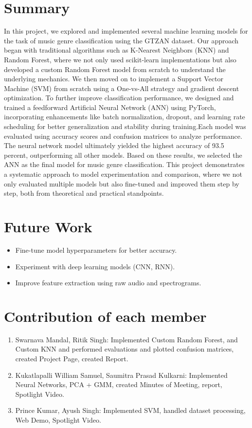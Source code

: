 \documentclass[a4paper]{article}
\theoremstyle{plain}
\theoremstyle{definition}
\begin{document}
\section{Summary}
\label{sec:summary}
In this project, we explored and implemented several machine learning models for the task of music genre classification using the GTZAN dataset. Our approach began with traditional algorithms such as K-Nearest Neighbors (KNN) and Random Forest, where we not only used scikit-learn implementations but also developed a custom Random Forest model from scratch to understand the underlying mechanics. We then moved on to implement a Support Vector Machine (SVM) from scratch using a One-vs-All strategy and gradient descent optimization. To further improve classification performance, we designed and trained a feedforward Artificial Neural Network (ANN) using PyTorch, incorporating enhancements like batch normalization, dropout, and learning rate scheduling for better generalization and stability during training.Each model was evaluated using accuracy scores and confusion matrices to analyze performance. The neural network model ultimately yielded the highest accuracy of 93.5 percent, outperforming all other models. Based on these results, we selected the ANN as the final model for music genre classification.
This project demonstrates a systematic approach to model experimentation and comparison, where we not only evaluated multiple models but also fine-tuned and improved them step by step, both from theoretical and practical standpoints.

\section{Future Work}
\begin{itemize}
    \item Fine-tune model hyperparameters for better accuracy.
    \item Experiment with deep learning models (CNN, RNN).
    \item Improve feature extraction using raw audio and spectrograms.
\end{itemize}



\appendix

\section{Contribution of each member}
\label{sec:contribution}
\begin{enumerate}
    \item Swarnava Mandal, Ritik Singh: Implemented Custom Random Forest, and Custom KNN and performed evaluations and plotted confusion matrices, created Project Page, created Report.
    \item Kukatlapalli William Samuel, Saumitra Prasad Kulkarni: Implemented Neural Networks, PCA + GMM, created Minutes of Meeting, report, Spotlight Video.
    \item Prince Kumar, Ayush Singh: Implemented SVM, handled dataset processing, Web Demo, Spotlight Video.
\end{enumerate}
\end{document}
